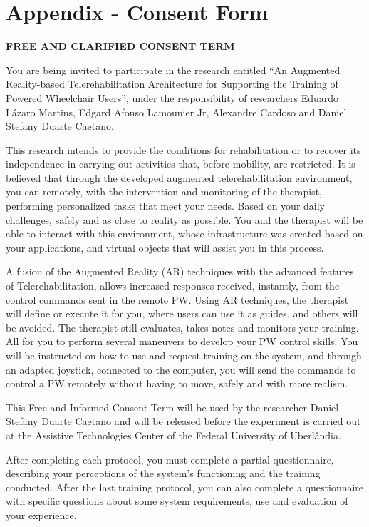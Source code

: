 \chapter{Appendix - Consent Form}
\label{sec:consentFormEN}

\begin{center}\textbf{FREE AND CLARIFIED CONSENT TERM}
\end{center}


\vspace{\baselineskip}
You are being invited to participate in the research entitled ``An Augmented Reality-based Telerehabilitation Architecture for Supporting the Training of Powered Wheelchair Users'', under the responsibility of researchers Eduardo Lázaro Martins, Edgard Afonso Lamounier Jr, Alexandre Cardoso and Daniel Stefany Duarte Caetano.

This research intends to provide the conditions for rehabilitation or to recover its independence in carrying out activities that, before mobility, are restricted. It is believed that through the developed augmented telerehabilitation environment, you can remotely, with the intervention and monitoring of the therapist, performing personalized tasks that meet your needs. Based on your daily challenges, safely and as close to reality as possible. You and the therapist will be able to interact with this environment, whose infrastructure was created based on your applications, and virtual objects that will assist you in this process.

A fusion of the Augmented Reality (AR) techniques with the advanced features of Telerehabilitation, allows increased responses received, instantly, from the control commands sent in the remote PW. Using AR techniques, the therapist will define or execute it for you, where users can use it as guides, and others will be avoided. The therapist still evaluates, takes notes and monitors your training. All for you to perform several maneuvers to develop your PW control skills. You will be instructed on how to use and request training on the system, and through an adapted joystick, connected to the computer, you will send the commands to control a PW remotely without having to move, safely and with more realism.

This Free and Informed Consent Term will be used by the researcher Daniel Stefany Duarte Caetano and will be released before the experiment is carried out at the Assistive Technologies Center of the Federal University of Uberlândia.

After completing each protocol, you must complete a partial questionnaire, describing your perceptions of the system's functioning and the training conducted. After the last training protocol, you can also complete a questionnaire with specific questions about some system requirements, use and evaluation of your experience.

